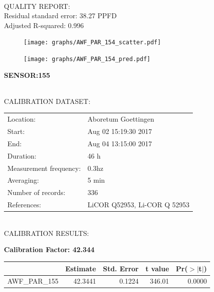 \documentclass[oneside]{report}
\begin{document}
\hrulefill\\
QUALITY REPORT:\\
Residual standard error: 38.27 PPFD\\
Adjusted R-squared: 0.996



\begin{figure}[H]
  \centering
  \texttt{[image: graphs/AWF\_PAR\_154\_scatter.pdf]}
\end{figure}




\begin{figure}[H]
  \centering
  \texttt{[image: graphs/AWF\_PAR\_154\_pred.pdf]}
\end{figure}

\pagebreak


\begin{center}
\large{\textbf{SENSOR:155}}\\
\end{center}

\hrulefill\\
CALIBRATION DATASET:\\
\begin{table}[h!]
  \centering
  \label{tab:table1}
  \begin{tabular}{ll}
    Location: & Aboretum Goettingen\\ 
    
    
    Start:  & Aug 02 15:19:30 2017 \\
    End:   & Aug 04 13:15:00 2017\\ 
    Duration: & 46 h\\
    Measurement frequency: & 0.3hz\\
    Averaging:  &5 min\\
    Number of records: & 336 \\
    References: & LiCOR Q52953, Li-COR Q 52953 \\
  \end{tabular}
\end{table}

\hrulefill\\
CALIBRATION RESULTS:\\


\begin{center}
\textbf{\large{Calibration Factor: 42.344}}\\
\end{center}
\begin{table}[ht]
\centering
\begin{tabular}{rrrrr}
  \hline
 & Estimate & Std. Error & t value & Pr($>$$|$t$|$) \\ 
  \hline
AWF\_PAR\_155 & 42.3441 & 0.1224 & 346.01 & 0.0000 \\ 
   \hline
\end{tabular}
\end{table}
\end{document}
